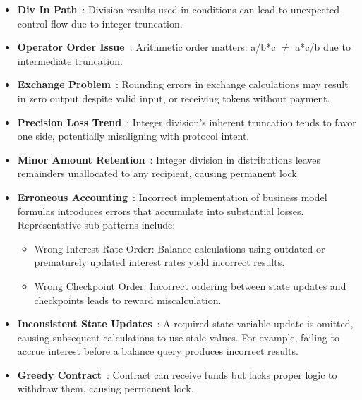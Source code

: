 \documentclass[pdflatex,sn-basic]{sn-jnl}%
\theoremstyle{thmstyleone}%
\theoremstyle{thmstyletwo}%
\theoremstyle{thmstylethree}%
\begin{document}
\begin{itemize}
    \item \textbf{Div In Path}~\citep{numscout}: Division results used in conditions can lead to unexpected control flow due to integer truncation.

    \item \textbf{Operator Order Issue}~\citep{numscout}: Arithmetic order matters: a/b*c $\neq$ a*c/b due to intermediate truncation.

    \item \textbf{Exchange Problem}~\citep{numscout}: Rounding errors in exchange calculations may result in zero output despite valid input, or receiving tokens without payment.

    \item \textbf{Precision Loss Trend}~\citep{numscout}: Integer division's inherent truncation tends to favor one side, potentially misaligning with protocol intent.

    \item \textbf{Minor Amount Retention}~\citep{numscout}: Integer division in distributions leaves remainders unallocated to any recipient, causing permanent lock.

    \item \textbf{Erroneous Accounting}~\citep{gptscan, exploitablebugs}: Incorrect implementation of business model formulas introduces errors that accumulate into substantial losses. Representative sub-patterns include:
    \begin{itemize}
        \item Wrong Interest Rate Order: Balance calculations using outdated or prematurely updated interest rates yield incorrect results.
        \item Wrong Checkpoint Order: Incorrect ordering between state updates and checkpoints leads to reward miscalculation.
    \end{itemize}

    \item \textbf{Inconsistent State Updates}~\citep{exploitablebugs}: A required state variable update is omitted, causing subsequent calculations to use stale values. For example, failing to accrue interest before a balance query produces incorrect results.

    \item \textbf{Greedy Contract}~\citep{flyinointment}: Contract can receive funds but lacks proper logic to withdraw them, causing permanent lock.

\end{itemize}
\end{document}
